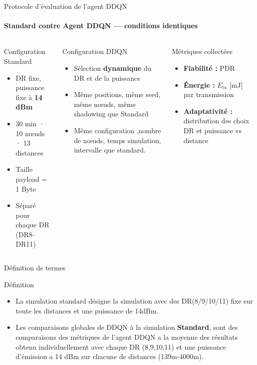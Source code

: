 \documentclass[aspectratio=169, 11pt]{beamer}
\begin{document}
	\begin{frame}{Protocole d'évaluation de l'agent DDQN}
		\framesubtitle{Standard contre Agent DDQN — conditions identiques}
		
		\begin{columns}[T]
			
			\begin{block}{Configuration Standard}
				\begin{itemize}\small
					\item DR fixe, puissance fixe à \textbf{14 dBm}
					\item 30 min · 10 nœuds · 13 distances
					\item Taille payload = 1 Byte
					\item Séparé pour chaque DR (DR8--DR11)
				\end{itemize}
			\end{block}
			
			\vspace{0.4em}
			\begin{block}{ Configuration DDQN}
				\begin{itemize}\small
					\item Sélection \textbf{dynamique} du DR et de la puissance
					\item Même positions, même seed, même nœuds, même shadowing  que Standard
					\item Même configuration ,nombre de nœuds, temps simulation, intervalle que standard.
				\end{itemize}
			\end{block}
			
			\begin{exampleblock}{ Métriques collectées}
				\begin{itemize}\small
					\item \textbf{Fiabilité :} PDR
					\item \textbf{Énergie :}
					$E_{\text{tx}}$ [mJ] par transmission
					\item \textbf{Adaptativité :} distribution des choix DR et puissance vs distance
				\end{itemize}
			\end{exampleblock}
		
		\end{columns}
	\end{frame}
	\begin{frame}{Définition de termes}
			\begin{block}{Définition}
			\begin{itemize}
				\item La simulation standard désigne la simulation avec des DR(8/9/10/11) fixe sur toute les distances et une puissance de 14dBm. 
				\item Les comparaisons globales de DDQN à la simulation \textbf{Standard}, sont des comparaisons des métriques de l'agent DDQN a la moyenne des  résultats obtenu individuellement avec chaque DR (8,9,10,11) et une puissance d’émission a 14 dBm sur chacune de distances (139m-4000m).
			\end{itemize}
		\end{block}
	\end{frame}
	
\end{document}
